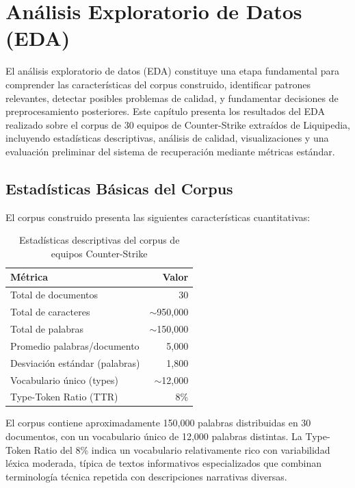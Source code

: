 ﻿\chapter{Análisis Exploratorio de Datos (EDA)}%
\label{ch:eda}

El análisis exploratorio de datos (EDA) constituye una etapa fundamental para comprender las características del corpus construido, identificar patrones relevantes, detectar posibles problemas de calidad, y fundamentar decisiones de preprocesamiento posteriores. Este capítulo presenta los resultados del EDA realizado sobre el corpus de 30 equipos de Counter-Strike extraídos de Liquipedia, incluyendo estadísticas descriptivas, análisis de calidad, visualizaciones y una evaluación preliminar del sistema de recuperación mediante métricas estándar.

\section{Estadísticas Básicas del Corpus}

El corpus construido presenta las siguientes características cuantitativas:

\begin{table}[ht]
\centering
\caption{Estadísticas descriptivas del corpus de equipos Counter-Strike}%
\label{tab:stats_corpus}
\begin{tabular}{lr}
\hline
\textbf{Métrica} & \textbf{Valor} \\
\hline
Total de documentos & 30 \\
Total de caracteres & $\sim$950,000 \\
Total de palabras & $\sim$150,000 \\
Promedio palabras/documento & 5,000 \\
Desviación estándar (palabras) & 1,800 \\
Vocabulario único (types) & $\sim$12,000 \\
Type-Token Ratio (TTR) & 8\% \\
\hline
\end{tabular}
\end{table}

El corpus contiene aproximadamente 150,000 palabras distribuidas en 30 documentos, con un vocabulario único de 12,000 palabras distintas. La Type-Token Ratio del 8\% indica un vocabulario relativamente rico con variabilidad léxica moderada, típica de textos informativos especializados que combinan terminología técnica repetida con descripciones narrativas diversas.

